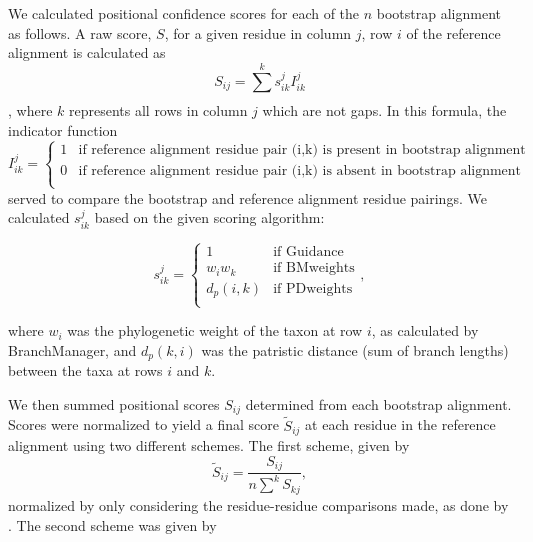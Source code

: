 \documentclass[12pt]{article}
\begin{document}
We calculated positional confidence scores for each of the $n$ bootstrap alignment as follows. A raw score, $S$, for a given residue in column $j$, row $i$ of the reference alignment is calculated as \begin{equation} S_{ij} = \sum\limits_{}^k s_{ik}^j I_{ik}^j\end{equation}, where $k$ represents all rows in column $j$ which are not gaps. 
In this formula, the indicator function 
\begin{equation}I_{ik}^j = \left\{ \begin{array}{rl}

              1                         &\mbox{if reference alignment residue pair (i,k) is present in bootstrap alignment} \\
              0            &\mbox{if reference alignment residue pair (i,k) is absent in bootstrap alignment} \\
                     \end{array} \right. 
\end{equation}
served to compare the bootstrap and reference alignment residue pairings.
We calculated $s_{ik}^j$ based on the given scoring algorithm:

\begin{equation}
s_{ik}^j = \left\{ \begin{array}{rl}

              1                         &\mbox{if Guidance} \\
              w_iw_k              &\mbox{if BMweights} \\
              d_p(i,k)              &\mbox{if PDweights} \\
                     \end{array} \right.,
\end{equation}

where $w_i$ was the phylogenetic weight of the taxon at row $i$, as calculated by BranchManager, and $d_p(k,i)$ was the patristic distance (sum of branch lengths) between the taxa at rows $i$ and $k$. 

We then summed positional scores $S_{ij}$ determined from each bootstrap alignment. Scores were normalized to yield a final score $\widetilde{S}_{ij}$ at each residue in the reference alignment using two different schemes. The first scheme, given by \begin{equation} \widetilde{S}_{ij} = \frac{S_{ij}}{n\sum\limits_{}^k S_{kj}}, \end{equation} normalized by only considering the residue-residue comparisons made, as done by \citep{Penn2010}. The second scheme was given by 
\end{document}
